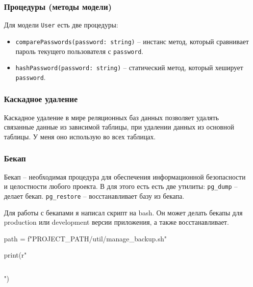 \subsubsection{Процедуры (методы модели)}
Для модели \texttt{User} есть две процедуры:
\begin{itemize}
    \item \texttt{comparePasswords(password: string)} -- инстанс метод, который сравнивает пароль текущего пользователя с \texttt{password}.
    \item \texttt{hashPassword(password: string)} -- статический метод, который хеширует \texttt{password}.
\end{itemize}

\subsubsection{Каскадное удаление}
Каскадное удаление в мире реляционных баз данных позволяет удалять связанные данные из зависимой таблицы, при удалении данных из основной таблицы. У меня оно использую во всех таблицах.

\subsubsection{Бекап}
Бекап -- необходимая процедура для обеспечения информационной безопасности и целостности любого проекта. В \textcite{postgres} для этого есть есть две утилиты:
\texttt{pg_dump} -- делает бекап.
\texttt{pg_restore} -- восстанавливает базу из бекапа.

Для работы с бекапами я написал скрипт на bash. Он может делать бекапы для production или development версии приложения, а также восстанавливает.

\begin{pycode}
path = f"{PROJECT_PATH}/util/manage_backup.sh"

print(r"\inputminted{bash}{" + path + r"}")
\end{pycode}

\clearpage